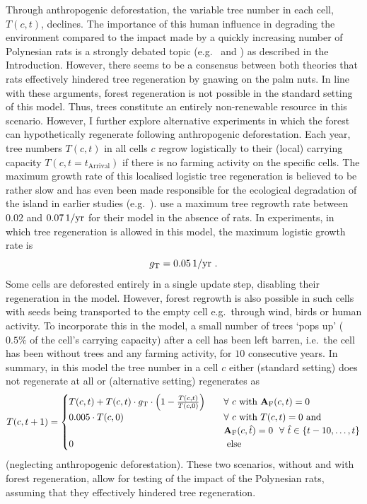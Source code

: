Through anthropogenic deforestation, the variable tree number in each cell, $T(c,t)$, declines.
The importance of this human influence in degrading the environment compared to the impact made by a quickly increasing number of Polynesian rats is a strongly debated topic (e.g.\ \citet{Bahn2017} and \citet{Hunt2007}) as described in the Introduction.
However, there seems to be a consensus between both theories that rats effectively hindered tree regeneration by gnawing on the palm nuts.
In line with these arguments, forest regeneration is not possible in the standard setting of this model.
Thus, trees constitute an entirely non-renewable resource in this scenario. 
However, I further explore alternative experiments in which the forest can hypothetically regenerate following anthropogenic deforestation.
Each year, tree numbers $T(c,t)$ in all cells $c$ regrow logistically to their (local) carrying capacity $T(c,t=t_\text{Arrival})$ if there is no farming activity on the specific cells.
The maximum growth rate of this localised logistic tree regeneration is believed to be rather slow and has even been made responsible for the ecological degradation of the island in earlier studies (e.g.\ \citet{Brander1998}).
\citet{Brandt2015} use a maximum tree regrowth rate between $0.02$ and $0.07 \, \rm{1/yr}$ for their model in the absence of rats.
In experiments, in which tree regeneration is allowed in this model, the maximum logistic growth rate is 
\begin{equation}
g_{\rm T} = 0.05\, \rm{1/yr} \ .
\end{equation}
Some cells are deforested entirely in a single update step, disabling their regeneration in the model. 
However, forest regrowth is also possible in such cells with seeds being transported to the empty cell e.g.\ through wind, birds or human activity.
To incorporate this in the model, a small number of trees `pops up' ($0.5\%$ of the cell's carrying capacity) after a cell has been left barren, i.e.\ the cell has been without trees and any farming activity, for $10$ consecutive years.
In summary, in this model the tree number in a cell $c$ either (standard setting) does not regenerate at all or (alternative setting) regenerates as
\begin{equation}\label{eq:treeupdate}
T(c,t+1)= \begin{cases}
T(c,t) + T(c,t) \cdot g_{\rm T} \cdot \left(1- \frac{T(c,t)}{T(c,0)}\right) \quad & \forall \ c \text{ with } \mathbf{A}_{\rm F}(c,t)=0 \\
0.005 \cdot T(c,0)  & \forall  \ c \text{ with } T(c,t)=0 \text{ and}\\
& \mathbf{A}_{\rm F}(c,\hat{t})=0 \  \ \forall \  \hat{t} \in \{t-10, \ldots, t\} \\
0 & \text{ else }
\end{cases}
\end{equation}
(neglecting anthropogenic deforestation).
These two scenarios, without and with forest regeneration, allow for testing of the impact of the Polynesian rats, assuming that they effectively hindered tree regeneration.

